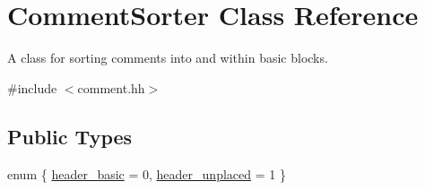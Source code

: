 \hypertarget{class_comment_sorter}{}\section{Comment\+Sorter Class Reference}
\label{class_comment_sorter}


A class for sorting comments into and within basic blocks.  




{\ttfamily \#include $<$comment.\+hh$>$}

\subsection*{Public Types}
\begin{DoxyCompactItemize}
\item 
enum \{ \mbox{\hyperlink{class_comment_sorter_a583f6f8791a910c7033cfe2f0c583d91a972094c6778abc30bfd1d6f02eec65db}{header\+\_\+basic}} = 0, 
\mbox{\hyperlink{class_comment_sorter_a583f6f8791a910c7033cfe2f0c583d91a7b207fc0588a61728f14c2e90ceb05d3}{header\+\_\+unplaced}} = 1
 \}
\end{DoxyCompactItemize}
